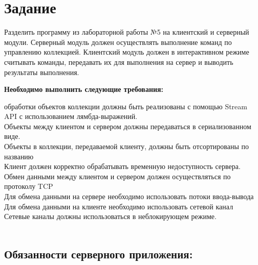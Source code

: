 

\section{Задание}
Разделить программу из лабораторной работы №5 на клиентский и серверный модули. Серверный модуль должен осуществлять выполнение команд по управлению коллекцией. Клиентский модуль должен в интерактивном режиме считывать команды, передавать их для выполнения на сервер и выводить результаты выполнения.

\textbf{Необходимо выполнить следующие требования:}

 обработки объектов коллекции должны быть реализованы с помощью Stream API с использованием лямбда-выражений.\\
Объекты между клиентом и сервером должны передаваться в сериализованном виде.\\
Объекты в коллекции, передаваемой клиенту, должны быть отсортированы по названию\\
Клиент должен корректно обрабатывать временную недоступность сервера.\\
Обмен данными между клиентом и сервером должен осуществляться по протоколу TCP\\
Для обмена данными на сервере необходимо использовать потоки ввода-вывода\\
Для обмена данными на клиенте необходимо использовать сетевой канал\\
Сетевые каналы должны использоваться в неблокирующем режиме.\\
\\
\subsection{Обязанности серверного приложения:}

